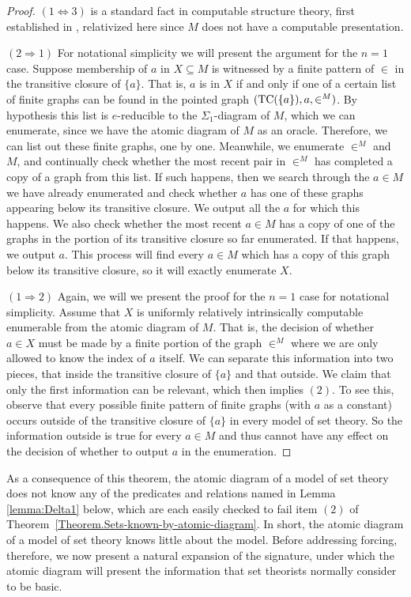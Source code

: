 \documentclass{amsart}
\begin{document}
\begin{proof}
$(1 \Leftrightarrow 3)$ is a standard fact in computable structure theory, first established in \cite{AKMS},
relativized here since $M$ does not have a computable presentation.

$(2 \Rightarrow 1)$ For notational simplicity we will present the argument for the $n = 1$ case. Suppose membership of $a$ in $X \subseteq M$ is witnessed by a finite pattern of $\in$ in the transitive closure of $\{a\}$. That is, $a$ is in $X$ if and only if one of a certain list of finite graphs can be found in the pointed graph $(\mathop{{\rm TC}}(\{a\}),a,\in^M)$. By hypothesis
this list is $e$-reducible to the $\Sigma_1$-diagram of $M$, which we can enumerate,
since we have the atomic diagram of $M$ as an oracle.  Therefore, we can list out these finite graphs,
one by one.  Meanwhile, we enumerate $\in^M$ and $M$, and continually check whether the most recent pair in $\in^M$ has completed a copy of a graph from this list. If such happens, then we search through the $a \in M$ we have already enumerated and check whether $a$ has one of these graphs appearing below its transitive closure. We output all the $a$ for which this happens. We also check whether the most recent $a \in M$ has a copy of one of the graphs in the portion of its transitive closure so far enumerated. If that happens, we output $a$. This process will find every $a \in M$ which has a copy of this graph below its transitive closure, so it will exactly enumerate $X$.

$(1 \Rightarrow 2)$ Again, we will we present the proof for the $n = 1$ case for notational simplicity. Assume that $X$ is uniformly relatively intrinsically computable enumerable from the atomic diagram of $M$. That is, the decision of whether $a \in X$ must be made by a finite portion of the graph $\in^M$ where we are only allowed to know the index of $a$ itself. We can separate this information into two pieces, that inside the transitive closure of $\{a\}$ and that outside. We claim that only the first information can be relevant, which then implies $(2)$. To see this, observe that every possible finite pattern of finite graphs (with $a$ as a constant) occurs outside of the transitive closure of $\{a\}$ in every model of set theory. So the information outside is true for every $a \in M$ and thus cannot have any effect on the decision of whether to output $a$ in the enumeration.
\end{proof}

As a consequence of this theorem, the atomic diagram of a model of set theory does not know any of the predicates
and relations named in Lemma \ref{lemma:Delta1} below, which are each easily checked to fail item $(2)$ of Theorem~\ref{Theorem.Sets-known-by-atomic-diagram}.
In short, the atomic diagram of a model of set theory knows little about the model.
Before addressing forcing, therefore, we now present a natural expansion of the signature,
under which the atomic diagram will present the information that set theorists normally consider to be basic.
\end{document}
